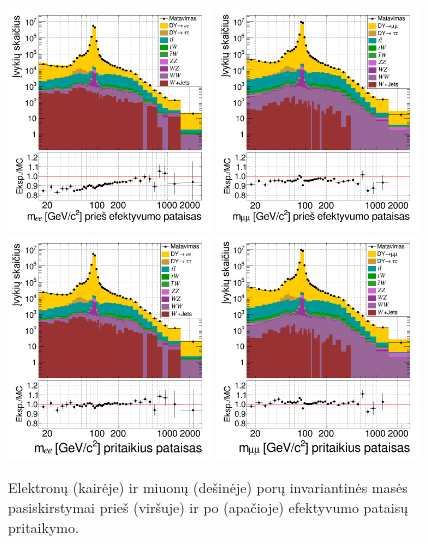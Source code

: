 \documentclass[a4paper, 12pt, oneside]{article}
\begin{document}
\begin{figure}[tbp]
	\includegraphics[width=0.48\textwidth]{ee_mass_beforeSF.png}
	\includegraphics[width=0.48\textwidth]{mumu_mass_beforeSF.png}
	\includegraphics[width=0.48\textwidth]{ee_mass_after.png}
	\includegraphics[width=0.48\textwidth]{mumu_mass_after.png}
	\caption{\label{fig:invMba} Elektronų (kairėje) ir miuonų (dešinėje) porų invariantinės masės pasiskirstymai
		prieš (viršuje) ir po (apačioje) efektyvumo pataisų pritaikymo.}
\end{figure}
\end{document}
